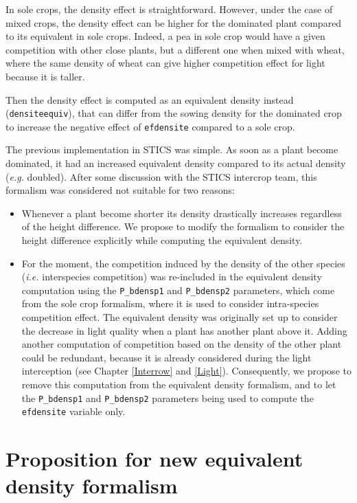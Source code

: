\documentclass[
]{book}
\begin{document}
In sole crops, the density effect is straightforward. However, under the case of mixed crops, the density effect can be higher for the dominated plant compared to its equivalent in sole crops. Indeed, a pea in sole crop would have a given competition with other close plants, but a different one when mixed with wheat, where the same density of wheat can give higher competition effect for light because it is taller.

Then the density effect is computed as an equivalent density instead (\texttt{densiteequiv}), that can differ from the sowing density for the dominated crop to increase the negative effect of \texttt{efdensite} compared to a sole crop.

The previous implementation in STICS was simple. As soon as a plant become dominated, it had an increased equivalent density compared to its actual density (\emph{e.g.} doubled). After some discussion with the STICS intercrop team, this formalism was considered not suitable for two reasons:

\begin{itemize}
\item
  Whenever a plant become shorter its density drastically increases regardless of the height difference. We propose to modify the formalism to consider the height difference explicitly while computing the equivalent density.
\item
  For the moment, the competition induced by the density of the other species (\emph{i.e.} interspecies competition) was re-included in the equivalent density computation using the \texttt{P\_bdensp1} and \texttt{P\_bdensp2} parameters, which come from the sole crop formalism, where it is used to consider intra-species competition effect. The equivalent density was originally set up to consider the decrease in light quality when a plant has another plant above it. Adding another computation of competition based on the density of the other plant could be redundant, because it is already considered during the light interception (see Chapter \ref{Interrow} and \ref{Light}). Consequently, we propose to remove this computation from the equivalent density formalism, and to let the \texttt{P\_bdensp1} and \texttt{P\_bdensp2} parameters being used to compute the \texttt{efdensite} variable only.
\end{itemize}

\hypertarget{proposition-for-new-equivalent-density-formalism}{%
\section{Proposition for new equivalent density formalism}\label{proposition-for-new-equivalent-density-formalism}}
\end{document}

